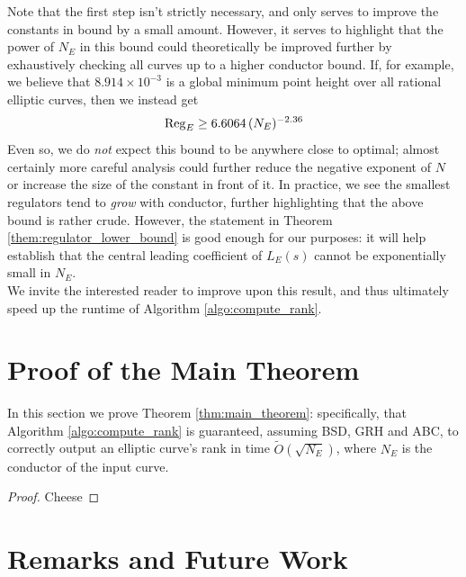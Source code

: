 \documentclass[10pt]{article}
\newcommand{\Les}{L_E(s)}
\begin{document}
Note that the first step isn't strictly necessary, and only serves to improve the constants in bound by a small amount. However, it serves to highlight that the power of $N_E$ in this bound could theoretically be improved further by exhaustively checking all curves up to a higher conductor bound. If, for example, we believe that $8.914\times 10^{-3}$ is a global minimum point height over all rational elliptic curves, then we instead get
\begin{equation}
\operatorname{Reg}_E \ge 6.6064 \, (N_E)^{-2.36}
\end{equation}
Even so, we do {\it not} expect this bound to be anywhere close to optimal; almost certainly more careful analysis could further reduce the negative exponent of $N$ or increase the size of the constant in front of it. In practice, we see the smallest regulators tend to {\it grow} with conductor, further highlighting that the above bound is rather crude. However, the statement in Theorem \ref{them:regulator_lower_bound} is good enough for our purposes: it will help establish that the central leading coefficient of $\Les$ cannot be exponentially small in $N_E$. \\

We invite the interested reader to improve upon this result, and thus ultimately speed up the runtime of Algorithm \ref{algo:compute_rank}.

\newpage
\section{Proof of the Main Theorem}\label{sec:main_thrm_proof}

In this section we prove Theorem \ref{thm:main_theorem}: specifically, that Algorithm \ref{algo:compute_rank} is guaranteed, assuming BSD, GRH and ABC, to correctly output an elliptic curve's rank in time $\tilde{O}(\sqrt{N_E})$, where $N_E$ is the conductor of the input curve. \\

\begin{proof}
Cheese
\end{proof}


\newpage
\section{Remarks and Future Work}



\newpage
{}

\end{document}
